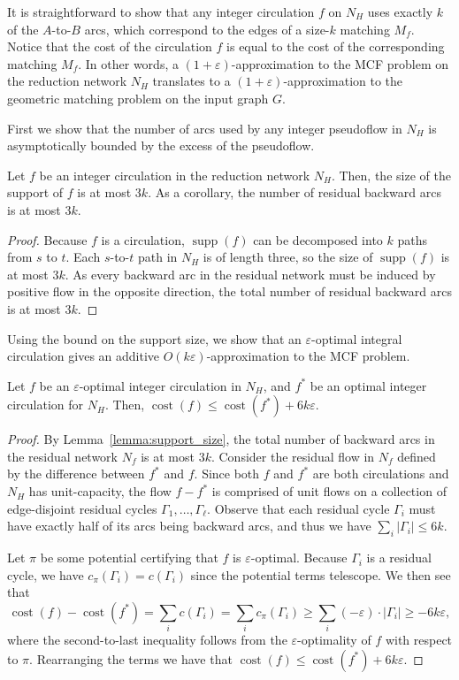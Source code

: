 \documentclass[a4paper,UKenglish]{socg-lipics-v2018}
\def\eps{\varepsilon}
\def\cost{\operatorname{cost}}
\def\supp{\operatorname{supp}}
\theoremstyle{plain}
\numberwithin{figure}{section}
\def\EMPH#1{\textbf{\emph{\boldmath #1}}}
\begin{document}
It is straightforward to show that any integer circulation $f$ on $N_H$ uses exactly
$k$ of the $A$-to-$B$ arcs, which correspond to the edges of a size-$k$
matching \EMPH{$M_f$}.
Notice that the cost of the circulation $f$ is equal to the cost of the corresponding matching $M_f$.
%
In other words, a $(1+\eps)$-approximation to the MCF problem on the reduction network $N_H$ translates to a $(1+\eps)$-approximation to the geometric matching problem on the input graph $G$.

First we show that the number of arcs used by any integer pseudoflow in $N_H$ is asymptotically bounded by the excess of the pseudoflow.

\begin{lemmarep}
\label{lemma:support_size}
Let $f$ be an integer circulation in the reduction network $N_H$.
Then, the size of the support of $f$ is at most $3k$.
As a corollary, the number of residual backward arcs is at most $3k$.
\end{lemmarep}

\begin{proof}
Because $f$ is a circulation, $\supp(f)$ can be decomposed into $k$  paths from $s$ to $t$.
Each $s$-to-$t$ path in $N_H$ is of length three, so the size of $\supp(f)$ is at most $3k$.
As every backward arc in the residual network must be induced by positive flow in the opposite direction,
the total number of residual backward arcs is at most $3k$.
\end{proof}

Using the bound on the support size, we show that an $\eps$-optimal integral circulation gives an additive $O(k\eps)$-approximation to the MCF problem.

\begin{lemmarep}
\label{lemma:goldberg_cost_add}
Let $f$ be an $\eps$-optimal integer circulation in $N_H$, and $f^*$ be an optimal integer circulation for $N_H$.
Then, $\cost(f) \leq \cost(f^*) + 6k\eps$.
\end{lemmarep}

\begin{proof}
By Lemma~\ref{lemma:support_size}, the total number of backward arcs in the residual network $N_f$ is at most $3k$.
%
Consider the residual flow in $N_f$ defined by the difference between $f^*$ and $f$.
Since both $f$ and $f^*$ are both circulations and $N_H$ has unit-capacity,
the flow $f - f^*$ is comprised of unit flows on a collection of edge-disjoint residual cycles $\Gamma_1, \ldots, \Gamma_\ell$.
Observe that each residual cycle $\Gamma_i$ must have exactly half of its arcs being backward arcs, and thus we have $\sum_i |\Gamma_i| \leq 6k$.

Let $\pi$ be some potential certifying that $f$ is $\eps$-optimal.
Because $\Gamma_i$ is a residual cycle, we have $c_\pi(\Gamma_i) = c(\Gamma_i)$ since the potential terms telescope.
We then see that
\[
	\cost(f) - \cost(f^*)
	= \sum_i c(\Gamma_i)
	= \sum_i c_\pi(\Gamma_i)
	\geq \sum_i (-\eps) \cdot |\Gamma_i|
	\geq -6k\eps,
\]
where the second-to-last inequality follows from the $\eps$-optimality of $f$
with respect to $\pi$.
Rearranging the terms we have that $\cost(f) \leq \cost(f^*) + 6k\eps$.
\end{proof}
\end{document}
